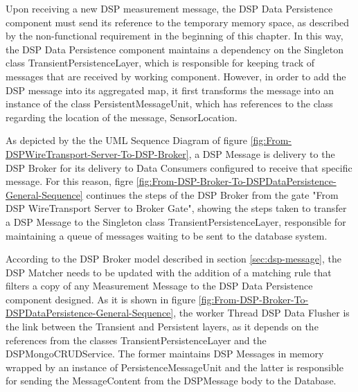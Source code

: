 Upon receiving a new DSP measurement message, the DSP Data Persistence
component must send its reference to the temporary memory space, as described
by the non-functional requirement in the beginning of this chapter. In this
way, the DSP Data Persistence component maintains a dependency on the
Singleton class TransientPersistenceLayer, which is responsible for keeping
track of messages that are received by working component. However, in order to
add the DSP message into its aggregated map, it first transforms the message
into an instance of the class PersistentMessageUnit, which has references to
the class regarding the location of the message, SensorLocation.

As depicted by the the UML Sequence Diagram \cite{uml} of figure
\ref{fig:From-DSPWireTransport-Server-To-DSP-Broker}, a DSP Message
is delivery to the DSP Broker for its delivery to Data Consumers configured to
receive that specific message. For this reason, figre
\ref{fig:From-DSP-Broker-To-DSPDataPersistence-General-Sequence} continues the
steps of the DSP Broker from the gate "From DSP WireTransport Server to Broker
Gate", showing the steps taken to transfer a DSP Message to the Singleton
class TransientPersistenceLayer, responsible for maintaining a queue of
messages waiting to be sent to the database system.

According to the DSP Broker model described in section \ref{sec:dsp-message}, 
the DSP Matcher needs to be updated with the addition of a matching rule that
filters a copy of any Measurement Message to the DSP Data Persistence component
designed. As it is shown in figure
\ref{fig:From-DSP-Broker-To-DSPDataPersistence-General-Sequence}, the worker
Thread DSP Data Flusher is the link between the Transient and Persistent
layers, as it depends on the references from the classes
TransientPersistenceLayer and the DSPMongoCRUDService. The former maintains
DSP Messages in memory wrapped by an instance of PersistenceMessageUnit and
the latter is responsible for sending the MessageContent from the DSPMessage
body to the Database.

